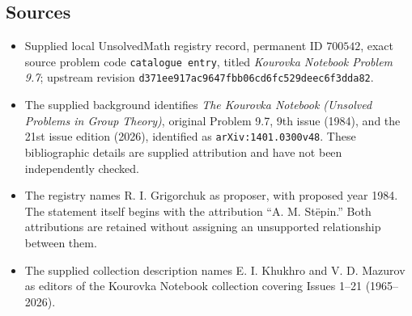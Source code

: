 \documentclass[11pt]{article}
\begin{document}
\subsection{Sources}
\begin{itemize}
\item Supplied local UnsolvedMath registry record, permanent ID \(700542\), exact source problem code \texttt{catalogue entry}, titled \emph{Kourovka Notebook Problem 9.7}; upstream revision \texttt{d371ee917ac9647fbb06cd6fc529deec6f3dda82}.
\item The supplied background identifies \emph{The Kourovka Notebook (Unsolved Problems in Group Theory)}, original Problem 9.7, 9th issue (1984), and the 21st issue edition (2026), identified as \texttt{arXiv:1401.0300v48}. These bibliographic details are supplied attribution and have not been independently checked.
\item The registry names R. I. Grigorchuk as proposer, with proposed year 1984. The statement itself begins with the attribution ``A. M. St\"epin.'' Both attributions are retained without assigning an unsupported relationship between them.
\item The supplied collection description names E. I. Khukhro and V. D. Mazurov as editors of the Kourovka Notebook collection covering Issues 1--21 (1965--2026).
\end{itemize}
\end{document}
